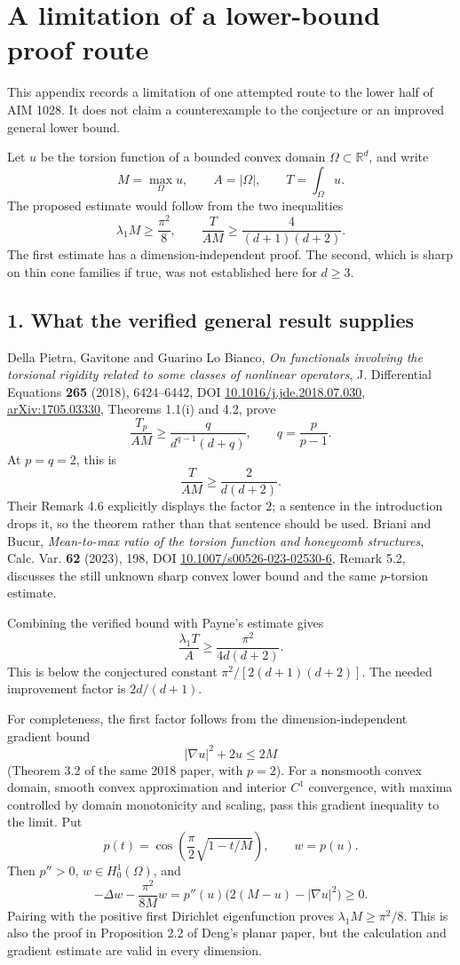 \documentclass[11pt,a4paper]{article}
\begin{document}
\section{A limitation of a lower-bound proof route}
This appendix records a limitation of one attempted route to the lower half of AIM 1028. It does not claim a counterexample to the conjecture or an improved general lower bound.

Let \(u\) be the torsion function of a bounded convex domain \(\Omega\subset\mathbb R^d\), and write
\[
M=\max_\Omega u,\qquad A=|\Omega|,\qquad T=\int_\Omega u.
\]
The proposed estimate would follow from the two inequalities
\[
\lambda_1 M\ge\frac{\pi^2}{8},\qquad
\frac{T}{AM}\ge\frac{4}{(d+1)(d+2)}.
\]
The first estimate has a dimension-independent proof. The second, which is sharp on thin cone families if true, was not established here for \(d\ge3\).

\subsection{1. What the verified general result supplies}

Della Pietra, Gavitone and Guarino Lo Bianco, \emph{On functionals involving the torsional rigidity related to some classes of nonlinear operators}, J. Differential Equations \textbf{265} (2018), 6424--6442, DOI \href{https://doi.org/10.1016/j.jde.2018.07.030}{10.1016/j.jde.2018.07.030}, \href{https://arxiv.org/abs/1705.03330}{arXiv:1705.03330}, Theorems 1.1(i) and 4.2, prove
\[
\frac{T_p}{A M}\ge \frac{q}{d^{q-1}(d+q)},\qquad q=\frac{p}{p-1}.
\]
At \(p=q=2\), this is
\[
\frac{T}{AM}\ge\frac{2}{d(d+2)}.
\]
Their Remark 4.6 explicitly displays the factor \(2\); a sentence in the introduction drops it, so the theorem rather than that sentence should be used. Briani and Bucur, \emph{Mean-to-max ratio of the torsion function and honeycomb structures}, Calc. Var. \textbf{62} (2023), 198, DOI \href{https://doi.org/10.1007/s00526-023-02530-6}{10.1007/s00526-023-02530-6}, Remark 5.2, discusses the still unknown sharp convex lower bound and the same \(p\)-torsion estimate.

Combining the verified bound with Payne's estimate gives
\[
\frac{\lambda_1T}{A}\ge\frac{\pi^2}{4d(d+2)}.
\]
This is below the conjectured constant \(\pi^2/[2(d+1)(d+2)]\). The needed improvement factor is \(2d/(d+1)\).

For completeness, the first factor follows from the dimension-independent gradient bound
\[
|\nabla u|^2+2u\le2M
\]
(Theorem 3.2 of the same 2018 paper, with \(p=2\)). For a nonsmooth convex domain, smooth convex approximation and interior
\(C^1\) convergence, with maxima controlled by domain monotonicity and
scaling, pass this gradient inequality to the limit. Put
\[
p(t)=\cos\!\left(\frac\pi2\sqrt{1-t/M}\right),\qquad w=p(u).
\]
Then \(p''>0\), \(w\in H^1_0(\Omega)\), and
\[
-\Delta w-\frac{\pi^2}{8M}w
=p''(u)\bigl(2(M-u)-|\nabla u|^2\bigr)\ge0.
\]
Pairing with the positive first Dirichlet eigenfunction proves \(\lambda_1M\ge\pi^2/8\). This is also the proof in Proposition 2.2 of Deng's planar paper, but the calculation and gradient estimate are valid in every dimension.
\end{document}
